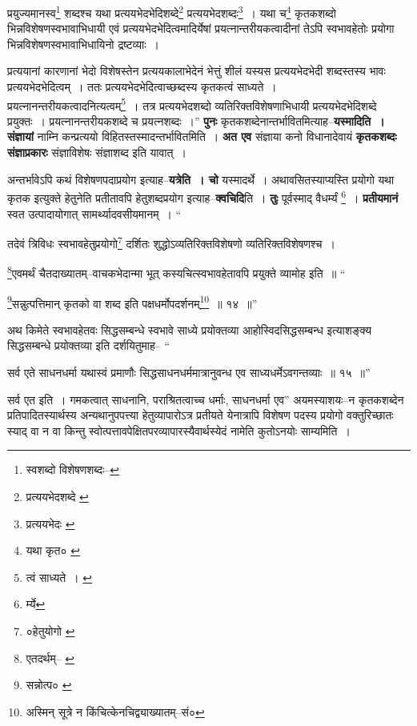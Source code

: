 \documentclass[article,12pt,a4paper]{memoir}
\begin{document}
	प्रयुज्यमानस्व\footnote{स्वशब्दो विशेषणशब्दः--\cite{dp-msD-n}} शब्दश्च यथा प्रत्ययभेदभेदिशब्दे\footnote{प्रत्ययभेदशब्दे \cite{dp-msB}} प्रत्ययभेदशब्दः\footnote{प्रत्ययभेदः \cite{dp-msA} \cite{dp-msB} \cite{dp-edP} \cite{dp-edH} \cite{dp-edE} \cite{dp-edN}} । यथा च\footnote{यथा कृत० \cite{dp-msC}} कृतकशब्दो भिन्नविशेषणस्वभावाभिधायी एवं प्रत्ययभेदभेदित्वमादिर्येषां प्रयत्नान्तरीयकत्वादीनां तेऽपि स्वभावहेतोः प्रयोगा भिन्नविशेषणस्वभावाभिधायिनो द्रष्टव्याः । 
	  
	प्रत्ययानां कारणानां भेदो विशेषस्तेन प्रत्ययकालाभेदेनं भेत्तुं शीलं यस्यस प्रत्ययभेदभेदी शब्दस्तस्य भावः प्रत्ययभेदभेदित्वम् । ततः प्रत्ययभेदभेदित्वाच्छब्दस्य कृतकत्वं साध्यते । प्रयत्नानन्तरीयकत्वादनित्यत्वम्\footnote{त्वं साध्यते । \cite{dp-msA} \cite{dp-edP} \cite{dp-edH} \cite{dp-edE} \cite{dp-edN}} । तत्र प्रत्ययभेदशब्दो व्यतिरिक्तविशेषणाभिधायी प्रत्ययभेदभेदिशब्दे प्रयुक्तः । प्रयत्नानन्तरीयकशब्दे च प्रयत्नशब्दः ।” \textbf{पुनः} कृतकशब्देनान्तर्भावितमित्याह--\textbf{यस्मादिति । संज्ञायां} नाम्नि कन्प्रत्ययो विहितस्तस्मादन्तर्भावितमिति । \textbf{अत एव} संज्ञाया कनो विधानादेवायं \textbf{कृतकशब्दः संज्ञाप्रकारः} संज्ञाविशेषः संज्ञाशब्द इति यावात् ।
	\pend
      

	  \pstart अन्तर्भावेऽपि कथं विशेषणपदाप्रयोग इत्याह--\textbf{यत्रेति । चो} यस्मादर्थे । अथावसितस्याप्यस्ति प्रयोगो यथा कृतक इत्युक्ते हेतुनेति प्रतीतावपि हेतुशब्दप्रयोग इत्याह--\textbf{क्वचिदि}ति । \textbf{तुः} पूर्वस्माद् वैधर्म्यं \footnote{र्म्ये} । \textbf{प्रतीयमानं} स्वत उत्पादायोगात् सामर्थ्यादवसीयमानम् ।  \leavevmode{} “
	  
	तदेवं त्रिविधः स्वभावहेतुप्रयोगो\footnote{०हेतुयोगो \cite{dp-msB}} दर्शितः शुद्धोऽव्यतिरिक्तविशेषणो व्यतिरिक्तविशेषणश्च । 
	  
	\footnote{एतदर्थम्--\cite{dp-msB} \cite{dp-msD}}एवमर्थं चैतदाख्यातम्--वाचकभेदान्मा भूत् कस्यचित्स्वभावहेतावपि प्रयुक्ते व्यामोह इति ॥ “
	  
	\footnote{सन्नोत्प० \cite{dp-edE}}सन्नुत्पत्तिमान् कृतको वा शब्द इति पक्षधर्मोपदर्शनम्\footnote{अस्मिन् सूत्रे न किंचित्केनचिद्व्याख्यातम्--सं०} ॥ १४ ॥” 
	  
	अथ किमेते स्वभावहेतवः सिद्धसम्बन्धे स्वभावे साध्ये प्रयोक्तव्या आहोस्विदसिद्धसम्बन्ध इत्याशङ्क्य सिद्धसम्बन्धे प्रयोक्तव्या इति दर्शयितुमाह-- “
	  
	सर्व एते साधनधर्मा यथास्वं प्रमाणौः सिद्धसाधनधर्ममात्रानुवन्ध एव साध्यधर्मेऽवगन्तव्याः ॥ १५ ॥” 
	  
	सर्व एत इति । गमकत्वात् साधनानि, पराश्रितत्वाच्च धर्माः, साधनधर्मा एव” अयमस्याशयः--न कृतकशब्देन प्रतिपादितस्यार्थस्य अन्यथानुपपत्त्या हेतुव्यापारोऽत्र प्रतीयते येनात्रापि विशेषण \leavevmode{} पदस्य प्रयोगो वक्तुरिच्छातः स्याद् वा न वा किन्तु स्वोत्पत्तावपेक्षितपरव्यापारस्यैवार्थस्येदं नामेति कुतोऽनयोः साम्यमिति ।
	\pend
      
\end{document}
